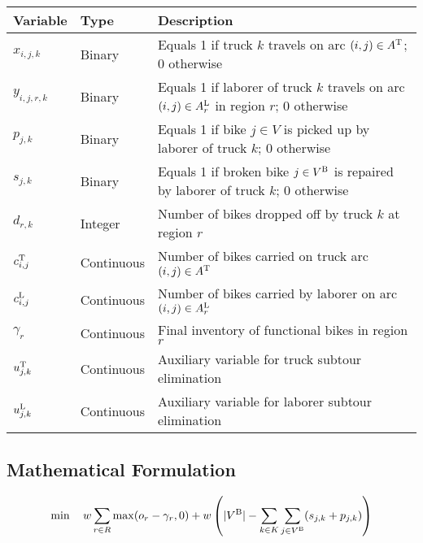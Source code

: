 \renewcommand{\arraystretch}{1.25}
\begin{longtable}{p{2cm}p{2cm}p{8cm}}
    \toprule
    Variable       & Type       & Description                                                                                     \\
    \midrule
    \endhead
    $x_{i,j,k}$    & Binary     & Equals 1 if truck $k$ travels on arc $(i,j) \in A^{\text{T}}$; 0 otherwise                            \\
    $y_{i,j,r,k}$  & Binary     & Equals 1 if laborer of truck $k$ travels on arc $(i,j) \in A_r^{\text{L}}$ in region $r$; 0 otherwise \\
    $p_{j,k}$      & Binary     & Equals 1 if bike $j \in V$ is picked up by laborer of truck $k$; 0 otherwise                    \\
    $s_{j,k}$      & Binary     & Equals 1 if broken bike $j \in V^{\text{B}}$ is repaired by laborer of truck $k$; 0 otherwise         \\
    $d_{r,k}$      & Integer    & Number of bikes dropped off by truck $k$ at region $r$                                          \\
    $c_{i,j}^{\text{T}}$ & Continuous & Number of bikes carried on truck arc $(i,j) \in A^{\text{T}}$                                         \\
    $c_{i,j}^{\text{L}}$ & Continuous & Number of bikes carried by laborer on arc $(i,j) \in A_r^{\text{L}}$                                  \\
    $\gamma_r$     & Continuous & Final inventory of functional bikes in region $r$                                               \\
    $u_{j,k}^{\text{T}}$ & Continuous & Auxiliary variable for truck subtour elimination                                                \\
    $u_{j,k}^{\text{L}}$ & Continuous & Auxiliary variable for laborer subtour elimination                                              \\
    \bottomrule
\end{longtable}

\subsection{Mathematical Formulation}

\begin{linenomath}
    \begin{equation}
        \min \quad w\sum_{r \in R} \max(o_r - \gamma_r, 0) + w\left(|V^{\text{B}}| - \sum_{k \in K}\sum_{j \in V^{\text{B}}}(s_{j,k} + p_{j,k})\right) \label{eq:objective}
    \end{equation}

\end{linenomath}

